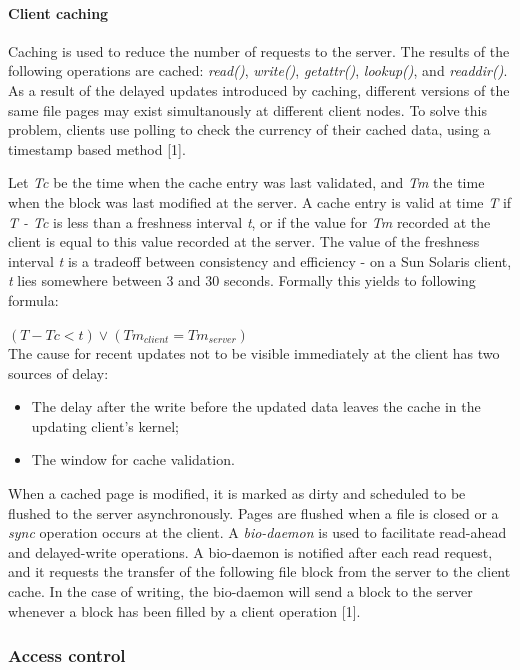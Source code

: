 \paragraph{Client caching}

Caching is used to reduce the number of requests to the server. The results of the following operations are cached: \textit{read()}, \textit{write()}, \textit{getattr()}, \textit{lookup()}, and \textit{readdir()}. As a result of the delayed updates introduced by caching, different versions of the same file pages may exist simultanously at different client nodes. To solve this problem, clients use polling to check the currency of their cached data, using a timestamp based method [1].

Let \textit{Tc} be the time when the cache entry was last validated, and \textit{Tm} the time when the block was last modified at the server. A cache entry is valid at time \textit{T} if \textit{T - Tc} is less than a freshness interval \textit{t}, or if the value for \textit{Tm} recorded at the client is equal to this value recorded at the server. The value of the freshness interval \textit{t} is a tradeoff between consistency and efficiency - on a Sun Solaris client, \textit{t} lies somewhere between 3 and 30 seconds. Formally this yields to following formula:

$(T - Tc < t) \vee (Tm_{client} = Tm_{server})$ \\

The cause for recent updates not to be visible immediately at the client has two sources of delay:
\begin{itemize}
	\item The delay after the write before the updated data leaves the cache in the updating client's kernel;
	\item The window for cache validation.
\end{itemize}

When a cached page is modified, it is marked as dirty and scheduled to be flushed to the server asynchronously. Pages are flushed when a file is closed or a \textit{sync} operation occurs at the client. A \emph{bio-daemon} is used to facilitate read-ahead and delayed-write operations. A bio-daemon is notified after each read request, and it requests the transfer of the following file block from the server to the client cache. In the case of writing, the bio-daemon will send a block to the server whenever a block has been filled by a client operation [1].


\subsubsection{Access control}

